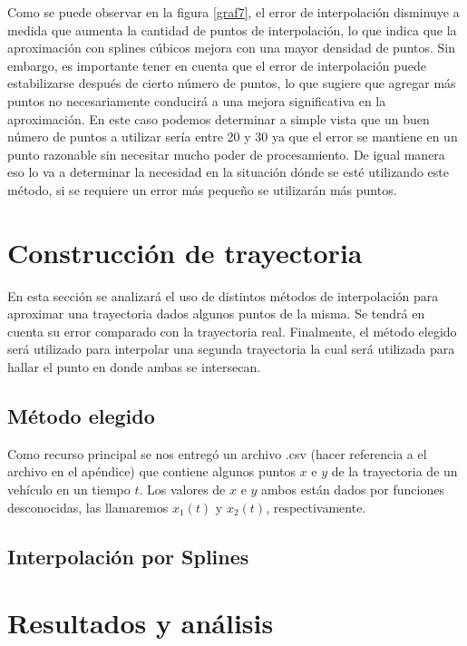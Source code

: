 \documentclass[12pt,a4]{article} %
\begin{document}
\begin{multicols}{2}
Como se puede observar en la figura \ref{graf7}, el error de interpolación disminuye a medida que aumenta la cantidad de puntos de interpolación, lo que indica que la aproximación con splines cúbicos mejora con una mayor densidad de puntos. Sin embargo, es importante tener en cuenta que el error de interpolación puede estabilizarse después de cierto número de puntos, lo que sugiere que agregar más puntos no necesariamente conducirá a una mejora significativa en la aproximación. En este caso podemos determinar a simple vista que un buen número de puntos a utilizar sería entre 20 y 30 ya que el error se mantiene en un punto razonable sin necesitar mucho poder de procesamiento. De igual manera eso lo va a determinar la necesidad en la situación dónde se esté utilizando este método, si se requiere un error más pequeño se utilizarán más puntos.

\section{Construcción de trayectoria}

En esta sección se analizará el uso de distintos métodos de interpolación para aproximar una trayectoria dados algunos puntos de la misma. Se tendrá en cuenta su error comparado con la trayectoria real. Finalmente, el método elegido será utilizado para interpolar una segunda trayectoria la cual será utilizada para hallar el punto en donde ambas se intersecan.

\subsection{Método elegido}

Como recurso principal se nos entregó un archivo .csv (hacer referencia a el archivo en el apéndice) que contiene algunos puntos $x$ e $y$ de la trayectoria de un vehículo en un tiempo $t$. Los valores de $x$ e $y$ ambos están dados por funciones desconocidas, las llamaremos $x_1(t)$ y $x_2(t)$, respectivamente.

\subsection{Interpolación por Splines}



\section{Resultados y análisis}


\end{multicols}
\end{document}
